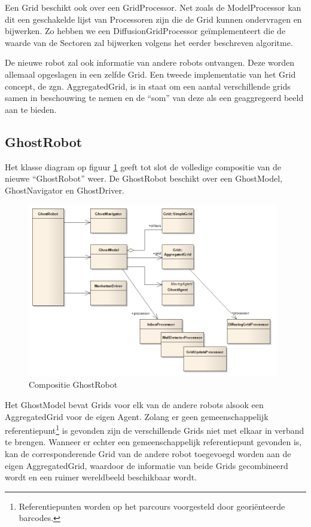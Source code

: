 \documentclass[12pt,a4paper]{report}
\begin{document}
Een Grid beschikt ook over een GridProcessor. Net zoals de ModelProcessor kan dit een geschakelde lijst van Processoren zijn die de Grid kunnen ondervragen en bijwerken. Zo hebben we een DiffusionGridProcessor ge\"implementeert die de waarde van de Sectoren zal bijwerken volgens het eerder beschreven algoritme.

De nieuwe robot zal ook informatie van andere robots ontvangen. Deze worden allemaal opgeslagen in een zelfde Grid. Een tweede implementatie van het Grid concept, de zgn. AggregatedGrid, is in staat om een aantal verschillende grids samen in beschouwing te nemen en de ``som'' van deze als een geaggregeerd beeld aan te bieden.

\subsection{GhostRobot}

Het klasse diagram op figuur \ref{uml:ghostrobot} geeft tot slot de volledige compositie van de nieuwe ``GhostRobot'' weer. De GhostRobot beschikt over een GhostModel, GhostNavigator en GhostDriver.

\begin{figure}[htbp]
  \centering
  \includegraphics[width=110mm]{resources/ghostrobot.png}
  \caption{Compositie GhostRobot}
  \label{uml:ghostrobot}
\end{figure}

Het GhostModel bevat Grids voor elk van de andere robots alsook een AggregatedGrid voor de eigen Agent. Zolang er geen gemeenschappelijk referentiepunt\footnote{Referentiepunten worden op het parcours voorgesteld door geori\"enteerde barcodes.} is gevonden zijn de verschillende Grids niet met elkaar in verband te brengen. Wanneer er echter een gemeenschappelijk referentiepunt gevonden is, kan de corresponderende Grid van de andere robot toegevoegd worden aan de eigen AggregatedGrid, waardoor de informatie van beide Grids gecombineerd wordt en een ruimer wereldbeeld beschikbaar wordt.
\end{document}
